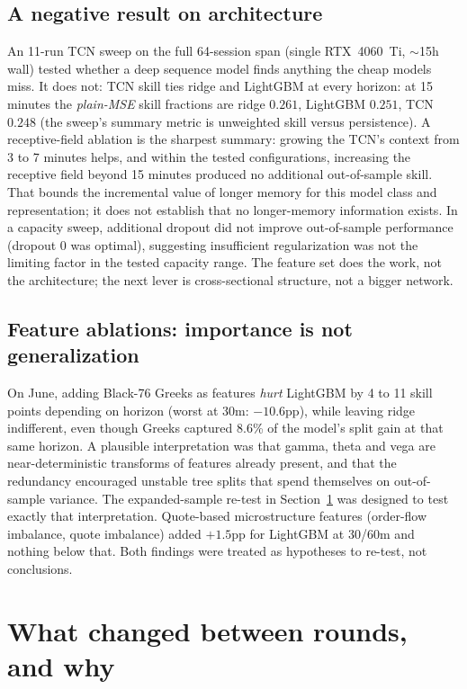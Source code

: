 \documentclass[11pt]{article}
\begin{document}
\subsection{A negative result on architecture}

An 11-run TCN sweep on the full 64-session span (single RTX~4060~Ti,
$\sim$15h wall) tested whether a deep sequence model finds anything the
cheap models miss. It does not: TCN skill ties ridge and LightGBM at every
horizon: at 15 minutes the \emph{plain-MSE} skill fractions are ridge
$0.261$, LightGBM $0.251$, TCN $0.248$ (the sweep's summary metric is
unweighted skill versus persistence). A receptive-field ablation is the
sharpest summary: growing the TCN's context from 3 to 7 minutes helps, and
within the tested configurations, increasing the receptive field beyond
15 minutes produced no additional out-of-sample skill. That bounds the
incremental value of longer memory for this model class and representation;
it does not establish that no longer-memory information exists. In a
capacity sweep, additional dropout did not improve out-of-sample performance
(dropout $0$ was optimal), suggesting insufficient regularization was not
the limiting factor in the tested capacity range. The feature set does the
work, not the architecture; the next lever is cross-sectional structure, not
a bigger network.

\subsection{Feature ablations: importance is not generalization}
\label{sec:ablations}

On June, adding Black-76 Greeks as features \emph{hurt} LightGBM by 4 to 11
skill points depending on horizon (worst at 30m: $-10.6$pp), while leaving
ridge indifferent, even though Greeks captured 8.6\% of the model's split
gain at that same horizon. A plausible interpretation was that gamma, theta
and vega are near-deterministic transforms of features already present, and
that the redundancy encouraged unstable tree splits that spend themselves on
out-of-sample variance. The expanded-sample re-test in
Section~\ref{sec:replication} was designed to test exactly that
interpretation. Quote-based microstructure features (order-flow imbalance,
quote imbalance) added $+1.5$pp for LightGBM at 30/60m and nothing below
that. Both findings were treated as hypotheses to re-test, not conclusions.

\section{What changed between rounds, and why}
\label{sec:replication}
\end{document}
